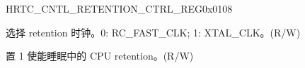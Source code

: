 \begin{register}{H}{RTC\_CNTL\_RETENTION\_CTRL\_REG}{0x0108}\label{regdesc:RTCCNTLRETENTIONCTRLREG}
%
%
%
%
%
%
\regnewline%
\begin{regdesc}\begin{reglist}
\label{fielddesc:RTCCNTLRETENTIONCLKSEL}\item [RTC\_CNTL\_RETENTION\_CLK\_SEL] 选择 retention 时钟。0: RC\_FAST\_CLK; 1: XTAL\_CLK。(R/W)
\label{fielddesc:RTCCNTLRETENTIONEN}\item [RTC\_CNTL\_RETENTION\_EN] 置 1 使能睡眠中的 CPU retention。(R/W)
\end{reglist}\end{regdesc}
\end{register}


